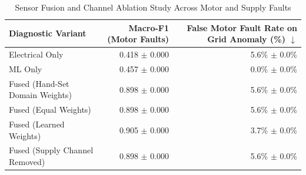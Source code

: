 \begin{table}[htbp]
\centering
\caption{Sensor Fusion and Channel Ablation Study Across Motor and Supply Faults}
\label{tab:fusion_ablation}
\begin{tabular}{lrr}
\toprule
Diagnostic Variant & Macro-F1 (Motor Faults) & False Motor Fault Rate on Grid Anomaly (\%) $\downarrow$ \\
\midrule
Electrical Only & 0.418 $\pm$ 0.000 & 5.6\% $\pm$ 0.0\% \\
ML Only & 0.457 $\pm$ 0.000 & 0.0\% $\pm$ 0.0\% \\
Fused (Hand-Set Domain Weights) & 0.898 $\pm$ 0.000 & 5.6\% $\pm$ 0.0\% \\
Fused (Equal Weights) & 0.898 $\pm$ 0.000 & 5.6\% $\pm$ 0.0\% \\
Fused (Learned Weights) & 0.905 $\pm$ 0.000 & 3.7\% $\pm$ 0.0\% \\
Fused (Supply Channel Removed) & 0.898 $\pm$ 0.000 & 5.6\% $\pm$ 0.0\% \\
\bottomrule
\end{tabular}
\end{table}